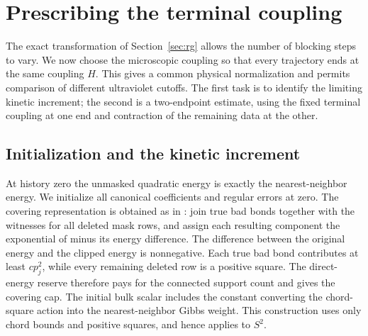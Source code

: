 \section{Prescribing the terminal coupling}
\label{sec:shooting}

The exact transformation of Section~\ref{sec:rg} allows the number of
blocking steps to vary. We now choose the microscopic coupling so that
every trajectory ends at the same coupling $H$. This gives a common
physical normalization and permits comparison of different ultraviolet
cutoffs. The first task is to identify the limiting kinetic increment;
the second is a two-endpoint estimate, using the fixed terminal coupling
at one end and contraction of the remaining data at the other.

\subsection{Initialization and the kinetic increment}

At history zero the unmasked quadratic energy is exactly the
nearest-neighbor energy. We initialize all canonical coefficients and
regular errors at zero. The covering representation is obtained as in
: join true bad bonds together with the witnesses
for all deleted mask rows, and assign each resulting component the
exponential of minus its energy difference. The difference between the
original energy and the clipped energy is nonnegative. Each true bad
bond contributes at least $cp_j^2$, while every remaining deleted row
is a positive square. The direct-energy reserve therefore pays for the
connected support count and gives the covering cap. The initial bulk
scalar includes the constant converting the chord-square action into
the nearest-neighbor Gibbs weight. This construction uses only chord
bounds and positive squares, and hence applies to $S^2$.

